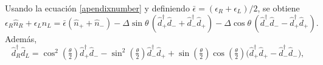 \begin{appendixs}
Usando la ecuación \eqref{apendixnumber} y definiendo $\bar{\epsilon} = (\epsilon_{R} + \epsilon_{L})/2$, se obtiene
\begin{equation}
    \epsilon_{R} \hat{n}_{R} + \epsilon_{L} \hat{n}_{L}
    = \bar{\epsilon}( \hat{n}_{+} + \hat{n}_{-} )
    - \Delta \sin\theta \, (\hat{d}^{\dagger}_{+}\hat{d}_{-} + \hat{d}^{\dagger}_{-}\hat{d}_{+})
    - \Delta \cos\theta \, (\hat{d}^{\dagger}_{-}\hat{d}_{-} - \hat{d}^{\dagger}_{+}\hat{d}_{+}).
\label{apendix5:ec1}
\end{equation}
Además,
\begin{equation}
    \hat{d}^{\dagger}_{R}\hat{d}_{L} =
    \cos^{2}(\tfrac{\theta}{2})\hat{d}^{\dagger}_{+}\hat{d}_{-}
    - \sin^{2}(\tfrac{\theta}{2}) \hat{d}^{\dagger}_{-}\hat{d}_{+}
    + \sin(\tfrac{\theta}{2})\cos(\tfrac{\theta}{2})\big( \hat{d}^{\dagger}_{+}\hat{d}_{+} - \hat{d}^{\dagger}_{-}\hat{d}_{-} \big),
    \label{apendix5:ec2}
\end{equation}


\end{appendixs}
